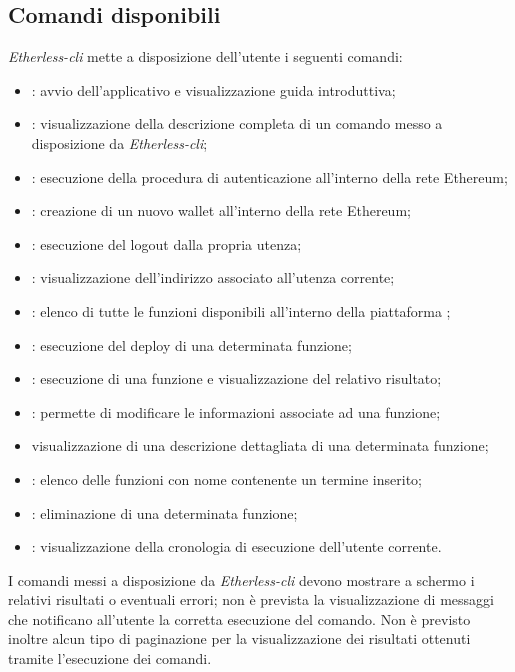 \subsection{Comandi disponibili}
\textit{Etherless-cli} mette a disposizione dell'utente i seguenti comandi: 
\begin{itemize}
	\item \init{}: avvio dell'applicativo e visualizzazione guida introduttiva; 
	\item \help{}: visualizzazione della descrizione completa di un comando messo a disposizione da \textit{Etherless-cli}; 
	\item \login{}: esecuzione della procedura di autenticazione all'interno della rete Ethereum; 
	\item \signup{}: creazione di un nuovo wallet all'interno della rete Ethereum; 
	\item \logout{}: esecuzione del logout dalla propria utenza; 
	\item \whoami{}: visualizzazione dell'indirizzo associato all'utenza corrente; 
	\item \lista{}: elenco di tutte le funzioni disponibili all'interno della piattaforma \NomeProgetto{}; 
	\item \deploy{}: esecuzione del deploy di una determinata funzione;  
	\item \run{}: esecuzione di una funzione e visualizzazione del relativo risultato; 
	\item \edit{}: permette di modificare le informazioni associate ad una funzione; 
	\item \info{} visualizzazione di una descrizione dettagliata di una determinata funzione; 
	\item \search{}: elenco delle funzioni con nome contenente un termine inserito; 
	\item \delete{}: eliminazione di una determinata funzione;
	\item \history{}: visualizzazione della cronologia di esecuzione dell'utente corrente. 
\end{itemize}
I comandi messi a disposizione da \textit{Etherless-cli} devono mostrare a schermo i relativi risultati o eventuali errori; non è prevista la visualizzazione di messaggi che notificano all'utente la corretta esecuzione del comando. Non è previsto inoltre alcun tipo di paginazione per la visualizzazione dei risultati ottenuti tramite l'esecuzione dei comandi.

